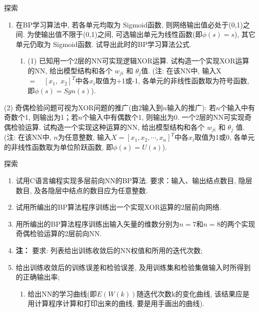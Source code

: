 \begin{custom}[explorecolor]{探索}
\begin{enumerate}
\item 在BP学习算法中, 若各单元均取为 Sigmoid函数, 则网络输出值必处于(0,1)之间. 为使输出值不限于(0,1)之间, 可选输出单元为线性函数(即$\phi(s)=s$), 其它单元仍取为 Sigmoid函数. 试导出此时的BP学习算法公式.
	\begin{enumerate}
	\item (1) 已知用一个2层的NN可实现逻辑XOR运算. 试构造一个实现XOR运算的NN, 给出模型结构和各个 $w_{ji} $ 和 $\theta_{j}$值. (注: 在该NN中, 输入X $= \quad [x_{1} ,\;x_{2} ]^{T}$中各$x_{i} $取值为$+$1或-1, 各单元的非线性函数取为符号函数, 即$\phi(s)=Sgn(s)$).
	\end{enumerate}
\end{enumerate}
(2) 奇偶检验问题可视为XOR问题的推广(由2输入到$n$输入的推广): 若$n$个输入中有奇数个1, 则输出为1；若$n$个输入中有偶数个1, 则输出为0. 一个2层的NN可实现奇偶检验运算. 试构造一个实现这种运算的NN, 给出模型结构和各个
$w_{ji} $ 和 $\theta_{j}$ 值. (注: 在该NN中, $n$为任意整数, 输入$X=[x_{1} , x_{2} ,\cdots, x_{n} ]^{T}$中各$x_{i}$取值为1或0, 各单元的非线性函数取为单位阶跃函数, 即$\phi(s)=U(s)$).
\end{custom}
\begin{custom}[explorecolor]{探索}
\begin{enumerate}
\item 试用C语言编程实现多层前向NN的BP算法. 要求：输入、输出结点数目, 隐层数目, 及各隐层中结点的数目应为任意整数.
\item 试用所编出的BP算法程序训练出一个实现XOR运算的2层前向网络.
\item 用所编出的BP算法程序训练出输入矢量的维数分别为$n=7$和$n=8$的两个实现奇偶检验运算的2层前向NN.
\item[\textbullet] \textbf{注： }要求: 列表给出训练收敛后的NN权值和所用的迭代次数;
\item 给出训练收敛后的训练误差和检验误差, 及用训练集和检验集做输入时所得到的正确输出率;
	\begin{enumerate}
	   \item 给出NN的学习曲线(即$E(W(k))$随迭代次数k的变化曲线, 该结果应是用计算程序计算和打印出来的曲线, 要是用手画出的曲线).
	\end{enumerate}
\end{enumerate}
\end{custom}
